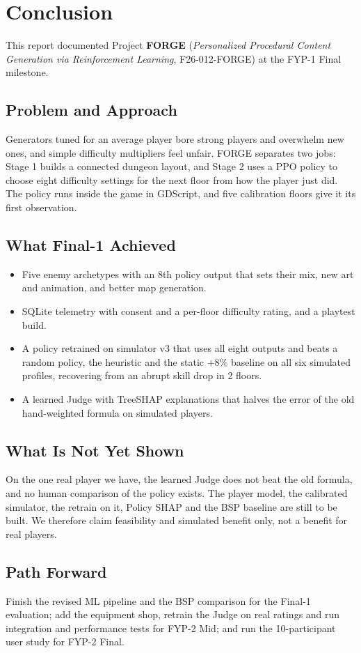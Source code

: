 \chapter{Conclusion}
\label{chap:conclusion}

This report documented Project \textbf{FORGE} (\textit{Personalized Procedural Content Generation via Reinforcement Learning}, F26-012-FORGE) at the FYP-1 Final milestone.

\section*{Problem and Approach}
Generators tuned for an average player bore strong players and overwhelm new ones, and simple difficulty multipliers feel unfair. FORGE separates two jobs: Stage 1 builds a connected dungeon layout, and Stage 2 uses a PPO policy to choose eight difficulty settings for the next floor from how the player just did. The policy runs inside the game in GDScript, and five calibration floors give it its first observation.

\section*{What Final-1 Achieved}
\begin{itemize}
    \item Five enemy archetypes with an 8th policy output that sets their mix, new art and animation, and better map generation.
    \item SQLite telemetry with consent and a per-floor difficulty rating, and a playtest build.
    \item A policy retrained on simulator v3 that uses all eight outputs and beats a random policy, the heuristic and the static $+8\%$ baseline on all six simulated profiles, recovering from an abrupt skill drop in 2 floors.
    \item A learned Judge with TreeSHAP explanations that halves the error of the old hand-weighted formula on simulated players.
\end{itemize}

\section*{What Is Not Yet Shown}
On the one real player we have, the learned Judge does not beat the old formula, and no human comparison of the policy exists. The player model, the calibrated simulator, the retrain on it, Policy SHAP and the BSP baseline are still to be built. We therefore claim feasibility and simulated benefit only, not a benefit for real players.

\section*{Path Forward}
Finish the revised ML pipeline and the BSP comparison for the Final-1 evaluation; add the equipment shop, retrain the Judge on real ratings and run integration and performance tests for FYP-2 Mid; and run the 10-participant user study for FYP-2 Final.
